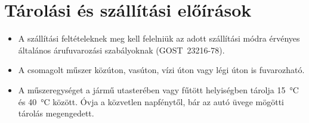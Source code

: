 \chapter{Tárolási és szállítási előírások}\label{ch:storage}

\begin{itemize}
    \item A szállítási feltételeknek meg kell felelniük az adott szállítási módra érvényes általános árufuvarozási szabályoknak (GOST~23216-78).
    \item A csomagolt műszer közúton, vasúton, vízi úton vagy légi úton is fuvarozható.
    \item A műszeregységet a jármű utasterében vagy fűtött helyiségben tárolja \SI{15}{\celsius} és \SI{40}{\celsius} között. Óvja a közvetlen napfénytől, bár az autó üvege mögötti tárolás megengedett.
\end{itemize}

